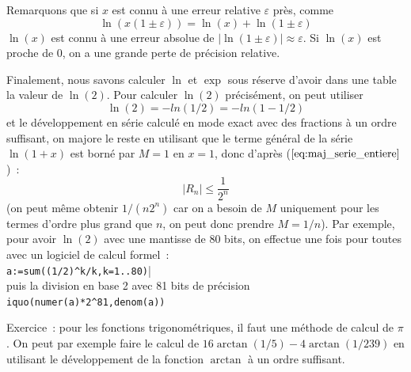 \documentclass[a4paper,11pt]{book}
\begin{document}
\begin{giacjshere}
Remarquons que si $x$ est connu \`a une erreur relative $\varepsilon$
pr\`es, comme
\[ \ln(x(1 \pm \varepsilon))=\ln(x) + \ln(1 \pm \varepsilon) \]
$\ln(x)$ est connu \`a une erreur absolue de 
$|\ln(1 \pm \varepsilon)| \approx \varepsilon$. Si $\ln(x)$ est proche
de 0, on a une grande perte de pr\'ecision relative.

Finalement, nous savons calculer $\ln$ et $\exp$ sous r\'eserve
d'avoir dans une table la valeur de $\ln(2)$. Pour calculer
$\ln(2)$ pr\'ecis\'ement, on peut utiliser
\[ \ln(2)=-ln(1/2)=-ln(1-1/2) \]
et le d\'eveloppement en s\'erie calcul\'e en mode exact avec des
fractions \`a un ordre suffisant, on majore le reste en utilisant 
que le terme g\'en\'eral de la s\'erie $\ln(1+x)$ est born\'e par
$M=1$ en $x=1$, donc d'apr\`es (\(\ref{eq:maj_serie_entiere}\))~:
\[ |R_n| \leq \frac{1}{2^n}\]
(on peut m\^eme obtenir $1/(n2^n)$ car on a besoin de $M$ uniquement
pour les termes d'ordre plus grand que $n$, on peut donc prendre $M=1/n$).
Par exemple, pour avoir $\ln(2)$ avec une mantisse de 80 bits,
on effectue une fois pour toutes avec un logiciel
de calcul formel~:\\
\verb|a:=sum((1/2)^k/k,k=1..80)||\\
puis la division en base 2 avec 81 bits de pr\'ecision
\verb|iquo(numer(a)*2^81,denom(a))|

Exercice~: pour les fonctions trigonom\'etriques, il faut une
m\'ethode de calcul de $\pi$. On peut par exemple faire le calcul
de $16 \arctan(1/5)-4\arctan(1/239)$ en utilisant le d\'eveloppement
de la fonction $\arctan$ \`a un ordre suffisant.


\end{giacjshere}
\end{document}
